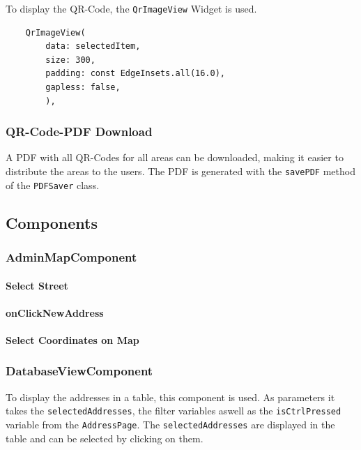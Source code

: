 To display the QR-Code, the \texttt{QrImageView} Widget is used. 

\lstset{style=mycsharp, caption=QrCode Generation in ListEditPage}
\begin{lstlisting}
    QrImageView(
        data: selectedItem,
        size: 300,
        padding: const EdgeInsets.all(16.0),
        gapless: false,
        ),
\end{lstlisting}

\subsubsection{QR-Code-PDF Download}
A PDF with all QR-Codes for all areas can be downloaded, making it easier to distribute the areas to the users. The PDF is generated with the \texttt{savePDF} method of the \texttt{PDFSaver} class.




\subsection{Components}

\subsubsection{AdminMapComponent}
\label{fig:AdminMapComponent}





\paragraph{Select Street}
\label{fig:Select Street}

\paragraph{onClickNewAddress}

\paragraph{Select Coordinates on Map}
\label{fig:Select Coordinates on Map}

\subsubsection{DatabaseViewComponent}
\label{fig:DatabaseViewComponent}
To display the addresses in a table, this component is used. As parameters it takes the \texttt{selectedAddresses}, the filter variables aswell as the \texttt{isCtrlPressed} variable from the \texttt{AddressPage}. The \texttt{selectedAddresses} are displayed in the table and can be selected by clicking on them. \\

